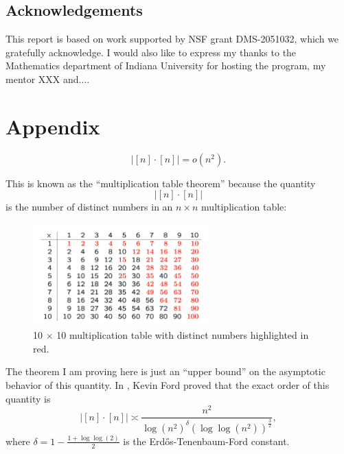 \documentclass[12pt]{amsart}
\begin{document}
\subsection*{Acknowledgements} %
This report is based on work supported by NSF grant DMS-2051032, which we gratefully acknowledge. I would also like to express my thanks to the Mathematics department of Indiana University for hosting the program, my mentor XXX and....




\section*{Appendix}

\begin{theorem*}
\[
    \left\lvert [n] \cdot [n] \right\rvert = o(n^{2})
.\]
\end{theorem*}

This is known as the ``multiplication table theorem'' because the quantity
\[
    \left\lvert [n] \cdot [n] \right\rvert 
\]
is the number of distinct numbers in an \(n \times n\) multiplication table:

\begin{figure}[h]
    \centering
    \includegraphics[width=0.6\textwidth]{mult-table.png}
    \caption{10 \(\times \) 10 multiplication table with distinct numbers highlighted in red.}
\end{figure}

The theorem I am proving here is just an ``upper bound'' on the asymptotic behavior of
this quantity. In \cite{Ford}, Kevin Ford proved that the exact order of this quantity is
\[
    \left\lvert [n] \cdot [n] \right\rvert \asymp \frac{n^{2}}{\log \left( n^{2} \right) ^{\delta} \left( \log \log \left( n^{2} \right) \right) ^{\frac{3}{2} } } 
,\]
where \(\delta = 1 - \frac{1 + \log \log \left( 2 \right)  }{2} \) is the Erd\H{o}s-Tenenbaum-Ford constant.
\end{document}
